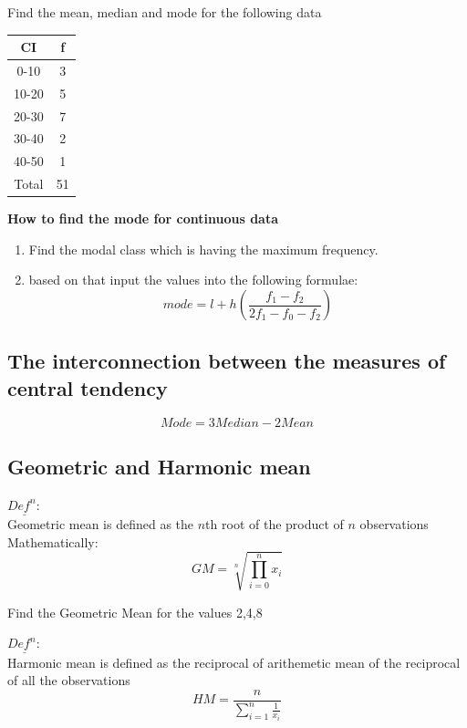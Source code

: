 \documentclass[11pt,letterpaper]{article}
\newenvironment{problem}[2][Problem]                                  
        {\begin{tcolorbox}[colback=white,colframe=gray!50,title=#1 #2]}
        {\end{tcolorbox}}
\newenvironment{definition}
	{\begin{mdframed}$\underline{\textit{Def}^\textit{n}:} $\\}
	{\end{mdframed}}
\begin{document}
\begin{problem}6
  Find the mean, median and mode for the following data
  \begin{center}
    \begin{tabular}{c|c}
      CI & f \\
      \hline
      0-10 & 3 \\
      10-20 & 5 \\ 
      20-30 & 7 \\ 
      30-40 & 2\\ 
      40-50 & 1 \\ 
      \hline
      Total & 51 \\
    \end{tabular}
  \end{center}
\end{problem}
\textbf{How to find the mode for continuous data}
\begin{enumerate}
  \item Find the modal class which is having the maximum frequency.
  \item based on that input the values into the following formulae:
    \[
      mode = l + h \left( \frac{f_1 - f_2}{2f_1-f_0-f_2} \right)
    \]
\end{enumerate}
\subsection{The interconnection between the measures of central tendency}
\[
  Mode = 3 Median - 2 Mean
\]

\subsection{Geometric and Harmonic mean}
\begin{definition}
   Geometric mean is defined as the $n$th root of the product of $n$ observations\\
   Mathematically:
   \[
     GM = \sqrt[n]{\prod_{i=0}^n x_i}
   \]
\end{definition}

\begin{problem}7
   Find the Geometric Mean for the values 2,4,8
\end{problem}

\begin{definition}
   Harmonic mean is defined as the reciprocal of arithemetic mean of the reciprocal of all the observations
   \[
      HM = \frac{n}{\sum_{i=1}^{n} \frac{1}{x_i}}
   \]
\end{definition}
\end{document}
